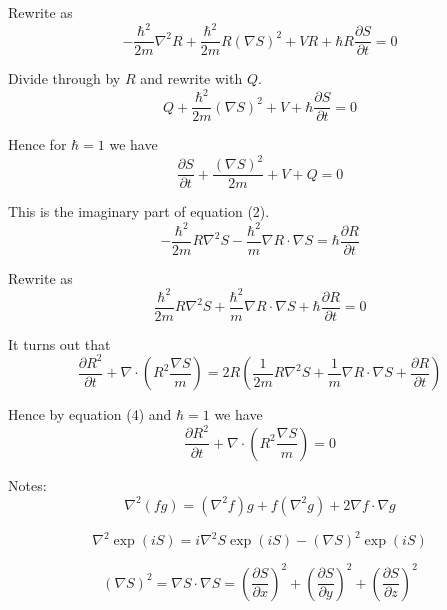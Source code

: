 Rewrite as
\begin{equation*}
-\frac{\hbar^2}{2m}\nabla^2R+\frac{\hbar^2}{2m}R(\nabla S)^2
+VR+\hbar R\frac{\partial S}{\partial t}=0
\end{equation*}

Divide through by $R$ and rewrite with $Q$.
\begin{equation*}
Q+\frac{\hbar^2}{2m}(\nabla S)^2+V
+\hbar\frac{\partial S}{\partial t}=0
\tag{3}
\end{equation*}

Hence for $\hbar=1$ we have
\begin{equation*}
\frac{\partial S}{\partial t}+\frac{(\nabla S)^2}{2m}+V+Q=0
\end{equation*}

This is the imaginary part of equation (2).
\begin{equation*}
-\frac{\hbar^2}{2m}R\nabla^2S-\frac{\hbar^2}{m}\nabla R\cdot\nabla S
=\hbar\frac{\partial R}{\partial t}
\end{equation*}

Rewrite as
\begin{equation*}
\frac{\hbar^2}{2m}R\nabla^2S+\frac{\hbar^2}{m}\nabla R\cdot\nabla S
+\hbar\frac{\partial R}{\partial t}=0
\tag{4}
\end{equation*}

It turns out that
\begin{equation*}
\frac{\partial R^2}{\partial t}+\nabla\cdot
\left(R^2\frac{\nabla S}{m}\right)
=2R\left(\frac{1}{2m}R\nabla^2S+\frac{1}{m}\nabla R\cdot\nabla S+\frac{\partial R}{\partial t}\right)
\tag{5}
\end{equation*}

Hence by equation (4) and $\hbar=1$ we have
\begin{equation*}
\frac{\partial R^2}{\partial t}+\nabla\cdot
\left(R^2\frac{\nabla S}{m}\right)=0
\end{equation*}

Notes:
\begin{equation*}
\nabla^2(fg)=\left(\nabla^2f\right)g+f\left(\nabla^2g\right)+2\nabla f\cdot\nabla g
\end{equation*}

\begin{equation*}
\nabla^2\exp(iS)=i\nabla^2S\exp(iS)-(\nabla S)^2\exp(iS)
\tag{6}
\end{equation*}

\begin{equation*}
(\nabla S)^2=\nabla S\cdot\nabla S
=\left(\frac{\partial S}{\partial x}\right)^2
+\left(\frac{\partial S}{\partial y}\right)^2
+\left(\frac{\partial S}{\partial z}\right)^2
\end{equation*}


